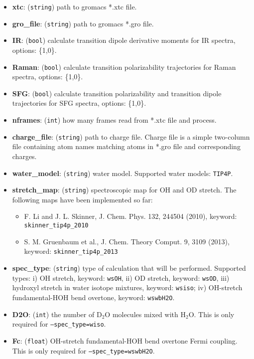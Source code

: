 \documentclass{article}
\begin{document}
\begin{itemize}

\item \textbf{xtc}: (\texttt{string}) path to gromacs *.xtc file.
\item \textbf{gro\_file}: (\texttt{string}) path to gromacs *.gro file.
\item \textbf{IR}: (\texttt{bool}) calculate transition dipole derivative moments for IR spectra, options: \{1,0\}.
\item \textbf{Raman}: (\texttt{bool}) calculate transition polarizability trajectories for Raman spectra, options: \{1,0\}.
\item \textbf{SFG}: (\texttt{bool}) calculate transition polarizability and transition dipole trajectories for SFG spectra, options: \{1,0\}.
\item \textbf{nframes}: (\texttt{int}) how many frames read from *.xtc file and process.
\item \textbf{charge\_file}: (\texttt{string}) path to charge file. Charge file is a simple two-column file containing atom names matching atoms in 
*.gro file and corresponding charges.
\item \textbf{water\_model}: (\texttt{string}) water model. Supported water models: \texttt{TIP4P}.
\item \textbf{stretch\_map}: (\texttt{string}) spectroscopic map for OH and OD stretch. The following maps have been implemented so far:
\begin{itemize}
\item F. Li and J. L. Skinner, J. Chem. Phys. 132, 244504 (2010), keyword: \texttt{skinner\_tip4p\_2010}
\item S. M. Gruenbaum et al., J. Chem. Theory Comput. 9, 3109 (2013), keyword: \texttt{skinner\_tip4p\_2013}
\end{itemize}

\item \textbf{spec\_type}: (\texttt{string}) type of calculation that will be performed. Supported types: i) OH stretch, keyword: \texttt{wsOH},
ii) OD stretch, keyword: \texttt{wsOD}, iii) hydroxyl stretch in water isotope mixtures, keyword: \texttt{wsiso}; iv) OH-stretch fundamental-HOH bend overtone,
keyword: \texttt{wswbH2O}.

\item \textbf{D2O}: (\texttt{int}) the number of D$_2$O molecules mixed with H$_2$O. This is only required for \texttt{--spec\_type=wiso}.

\item \textbf{Fc}: (\texttt{float}) OH-stretch fundamental-HOH bend overtone Fermi coupling. This is only required for \texttt{--spec\_type=wswbH2O}.


\end{itemize}
\end{document}
